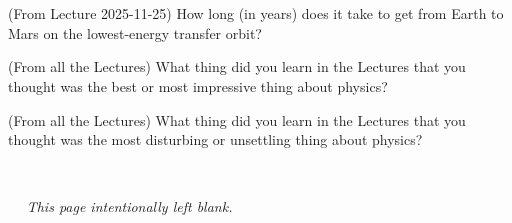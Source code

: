 \documentclass[12pt, letterpaper]{article}
\begin{document}
\vfill
~
\vfill

~\clearpage

\begin{problem} (From Lecture 2025-11-25)
  How long (in years) does it take to get from Earth to Mars on the lowest-energy
  transfer orbit?
\end{problem}

\vfill

\begin{problem} (From all the Lectures)
  What thing did you learn in the Lectures that you thought was the best or most impressive thing about physics?
\end{problem}

\vfill

\begin{problem} (From all the Lectures)
  What thing did you learn in the Lectures that you thought was the most disturbing or unsettling thing about physics?
\end{problem}

\vfill

~\clearpage

~
\vfill
~\hfill\textsl{This page intentionally left blank.}\hfill~
\vfill
~
\end{document}
